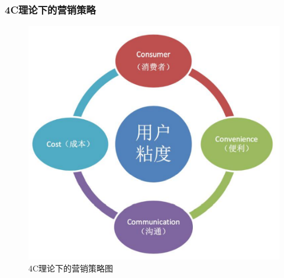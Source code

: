 \documentclass[UTF8]{ctexart}
\begin{document}
\subsubsection{4C理论下的营销策略}
\begin{figure}[H]
	\centering
	\includegraphics{marketing}
	\caption{4C理论下的营销策略图}
\end{figure}
\end{document}

